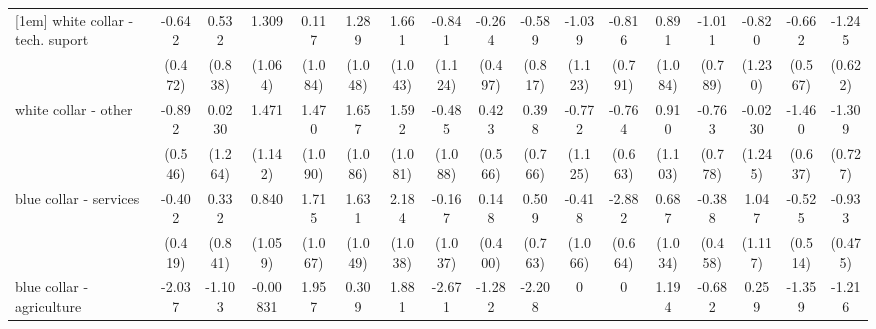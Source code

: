 {\begin{tabular}{l*{16}{c}}
[1em]
white collar - tech. suport&      -0.642         &       0.532         &       1.309         &       0.117         &       1.289         &       1.661         &      -0.841         &      -0.264         &      -0.589         &      -1.039         &      -0.816         &       0.891         &      -1.011         &      -0.820         &      -0.662         &      -1.245\sym{*}  \\
                    &     (0.472)         &     (0.838)         &     (1.064)         &     (1.084)         &     (1.048)         &     (1.043)         &     (1.124)         &     (0.497)         &     (0.817)         &     (1.123)         &     (0.791)         &     (1.084)         &     (0.789)         &     (1.230)         &     (0.567)         &     (0.622)         \\
[1em]
white collar - other&      -0.892         &      0.0230         &       1.471         &       1.470         &       1.657         &       1.592         &      -0.485         &       0.423         &       0.398         &      -0.772         &      -0.764         &       0.910         &      -0.763         &     -0.0230         &      -1.460\sym{*}  &      -1.309         \\
                    &     (0.546)         &     (1.264)         &     (1.142)         &     (1.090)         &     (1.086)         &     (1.081)         &     (1.088)         &     (0.566)         &     (0.766)         &     (1.125)         &     (0.663)         &     (1.103)         &     (0.778)         &     (1.245)         &     (0.637)         &     (0.727)         \\
[1em]
blue collar - services&      -0.402         &       0.332         &       0.840         &       1.715         &       1.631         &       2.184\sym{*}  &      -0.167         &       0.148         &       0.509         &      -0.418         &      -2.882\sym{***}&       0.687         &      -0.388         &       1.047         &      -0.525         &      -0.933\sym{*}  \\
                    &     (0.419)         &     (0.841)         &     (1.059)         &     (1.067)         &     (1.049)         &     (1.038)         &     (1.037)         &     (0.400)         &     (0.763)         &     (1.066)         &     (0.664)         &     (1.034)         &     (0.458)         &     (1.117)         &     (0.514)         &     (0.475)         \\
[1em]
blue collar - agriculture&      -2.037         &      -1.103         &    -0.00831         &       1.957         &       0.309         &       1.881         &      -2.671         &      -1.282         &      -2.208         &           0         &           0         &       1.194         &      -0.682         &       0.259         &      -1.359         &      -1.216         \\

\end{tabular}}
